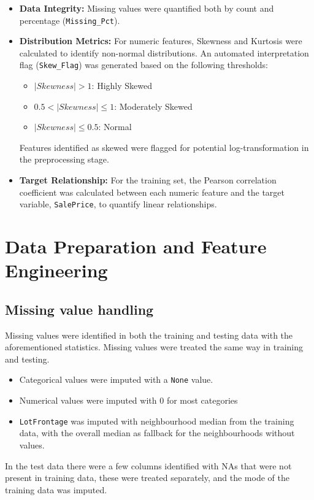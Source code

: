 \documentclass[12pt,oneside]{article} %
\begin{document}
\begin{itemize}
    \item \textbf{Data Integrity:} Missing values were quantified both by count and percentage (\texttt{Missing\_Pct}).
    \item \textbf{Distribution Metrics:} For numeric features, Skewness and Kurtosis were calculated to identify non-normal distributions. An automated interpretation flag (\texttt{Skew\_Flag}) was generated based on the following thresholds:
    \begin{itemize}
        \item $|Skewness| > 1$: Highly Skewed
        \item $0.5 < |Skewness| \le 1$: Moderately Skewed
        \item $|Skewness| \le 0.5$: Normal
    \end{itemize}
    Features identified as skewed were flagged for potential log-transformation in the preprocessing stage.
    \item \textbf{Target Relationship:} For the training set, the Pearson correlation coefficient was calculated between each numeric feature and the target variable, \texttt{SalePrice}, to quantify linear relationships.
\end{itemize}

\section{Data Preparation and Feature Engineering}

\subsection{Missing value handling}
Missing values were identified in both the training and testing data with the aforementioned statistics. Missing values were treated the same way in training and testing.
\begin{itemize}
    \item Categorical values were imputed with a \texttt{None} value. 
    \item Numerical values were imputed with $0$ for most categories
    \item \texttt{LotFrontage} was imputed with neighbourhood median from the training data, with the overall median as fallback for the neighbourhoods without values.
\end{itemize}
In the test data there were a few columns identified with NAs that were not present in training data, these were treated separately, and the mode of the training data was imputed.
\end{document}
